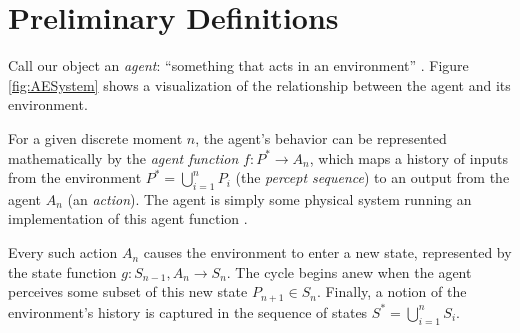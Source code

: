 \documentclass[12pt,letterpaper]{article}
\begin{document}







\section*{Preliminary Definitions}

Call our object an \emph{agent}: ``something that acts in an environment'' \cite[p.~4]{Poole:2010}. Figure \ref{fig:AESystem} shows a visualization of the relationship between the agent and its environment.

\begin{SCfigure}[][h]
	\centering
	\caption{A very simplified view of an isolated agent-environment system. The agent impacts the environment through its actions, and is influenced by its perception of the environment.}
	\label{fig:AESystem}
\end{SCfigure}

For a given discrete moment $n$, the agent's behavior can be represented mathematically by the \emph{agent function} $f : P^\ast \to A_n$, which maps a history of inputs from the environment $P^\ast = \bigcup\limits_{i=1}^n P_i$ (the \emph{percept sequence}) to an output from the agent $A_n$ (an \emph{action}). The agent is simply some physical system running an implementation of this agent function \cite{Russell:2010}.

Every such action $A_n$ causes the environment to enter a new state, represented by the state function $g : S_{n-1}, A_n \to S_n$. The cycle begins anew when the agent perceives some subset of this new state $P_{n+1} \in S_n$. Finally, a notion of the environment's history is captured in the sequence of states $S^\ast = \bigcup\limits_{i=1}^n S_i$.
\end{document}
